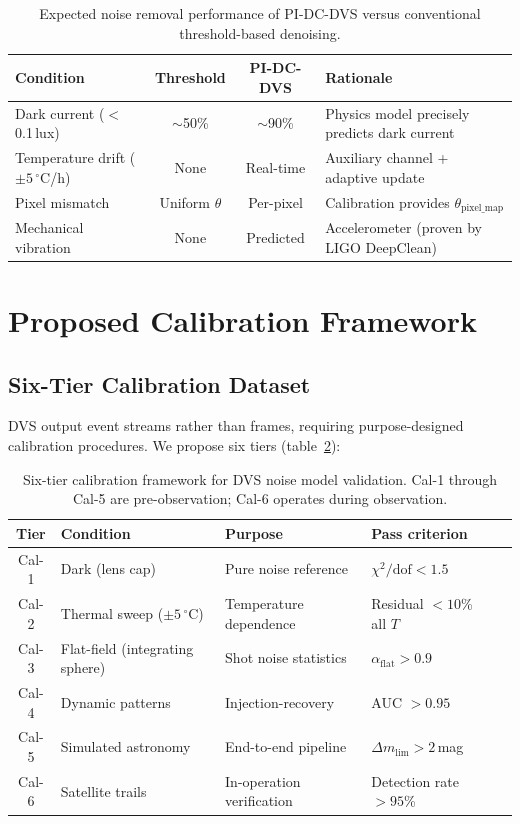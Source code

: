 \documentclass[12pt]{article}
\begin{document}
\begin{table}[htbp]
\centering
\caption{Expected noise removal performance of PI-DC-DVS versus conventional threshold-based denoising.}
\label{tab:performance}
\begin{tabular}{@{}lccl@{}}
\toprule
Condition & Threshold & PI-DC-DVS & Rationale \\
\midrule
Dark current ($<$0.1\,lux) & $\sim$50\% & $\sim$90\% & Physics model precisely predicts dark current \\
Temperature drift ($\pm5\,^\circ$C/h) & None & Real-time & Auxiliary channel + adaptive update \\
Pixel mismatch & Uniform $\theta$ & Per-pixel & Calibration provides $\theta_\mathrm{pixel\_map}$ \\
Mechanical vibration & None & Predicted & Accelerometer (proven by LIGO DeepClean) \\
\bottomrule
\end{tabular}
\end{table}


\section{Proposed Calibration Framework}
\label{sec:calibration}

\subsection{Six-Tier Calibration Dataset}

DVS output event streams rather than frames, requiring purpose-designed calibration procedures.
We propose six tiers (table~\ref{tab:calibration}):

\begin{table}[htbp]
\centering
\caption{Six-tier calibration framework for DVS noise model validation. Cal-1 through Cal-5 are pre-observation; Cal-6 operates during observation.}
\label{tab:calibration}
\begin{tabular}{@{}clllc@{}}
\toprule
Tier & Condition & Purpose & Pass criterion \\
\midrule
Cal-1 & Dark (lens cap) & Pure noise reference & $\chi^2/\mathrm{dof} < 1.5$ \\
Cal-2 & Thermal sweep ($\pm5\,^\circ$C) & Temperature dependence & Residual $< 10$\% all $T$ \\
Cal-3 & Flat-field (integrating sphere) & Shot noise statistics & $\alpha_\mathrm{flat} > 0.9$ \\
Cal-4 & Dynamic patterns & Injection-recovery & AUC $> 0.95$ \\
Cal-5 & Simulated astronomy & End-to-end pipeline & $\Delta m_\mathrm{lim} > 2$\,mag \\
Cal-6 & Satellite trails & In-operation verification & Detection rate $>95$\% \\
\bottomrule
\end{tabular}
\end{table}
\end{document}
